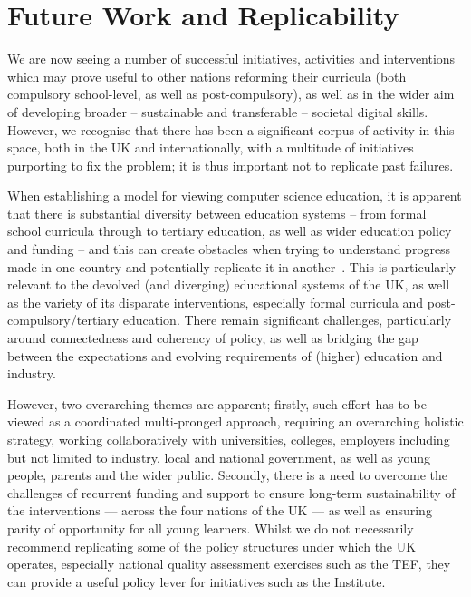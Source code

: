 \documentclass[sigconf,anonymous]{acmart}
\begin{document}
\section{Future Work and Replicability}\label{concl}

We are now seeing a number of successful initiatives, activities and
interventions which may prove useful to other nations reforming their
curricula (both compulsory school-level, as well as post-compulsory),
as well as in the wider aim of developing broader -- sustainable and
transferable -- societal digital skills. However, we recognise that
there has been a significant corpus of activity in this space, both in
the UK and internationally, with a multitude of initiatives purporting
to fix the problem; it is thus important not to replicate past
failures.

When establishing a model for viewing computer science education, it
is apparent that there is substantial diversity between education
systems -- from formal school curricula through to tertiary education,
as well as wider education policy and funding -- and this can create
obstacles when trying to understand progress made in one country and
potentially replicate it in another~\cite{hubwieser:2013}. This is
particularly relevant to the devolved (and diverging) educational
systems of the UK, as well as the variety of its disparate
interventions, especially formal curricula and
post-compulsory/tertiary education.  There remain significant
challenges, particularly around connectedness and coherency of policy,
as well as bridging the gap between the expectations and evolving
requirements of (higher) education and industry.

However, two overarching themes are apparent; firstly, such effort has
to be viewed as a coordinated multi-pronged approach, requiring an
overarching holistic strategy, working collaboratively with
universities, colleges, employers including but not limited to
industry, local and national government, as well as young people,
parents and the wider public. Secondly, there is a need to overcome
the challenges of recurrent funding and support to ensure long-term
sustainability of the interventions --- across the four nations of the
UK --- as well as ensuring parity of opportunity for all young
learners. Whilst we do not necessarily recommend replicating some of
the policy structures under which the UK operates, especially national
quality assessment exercises such as the TEF, they can provide a
useful policy lever for initiatives such as the Institute.
\end{document}
